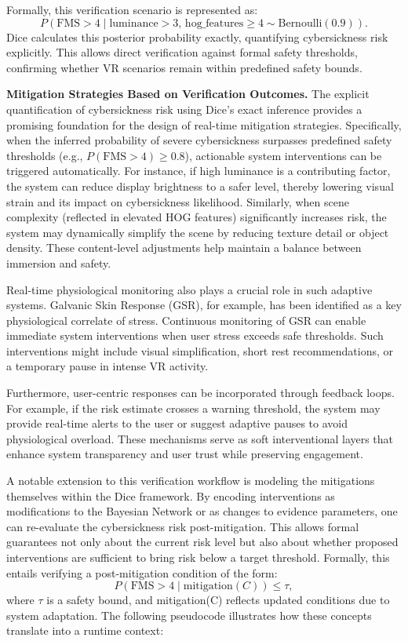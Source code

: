\documentclass{vgtc}                          %
\begin{document}
Formally, this verification scenario is represented as:
\begin{equation}
    P(\text{FMS} > 4 \mid \text{luminance}>3,\,\text{hog\_features}\geq 4\sim\text{Bernoulli}(0.9)).
\end{equation}
Dice calculates this posterior probability exactly, quantifying cybersickness risk explicitly. This allows direct verification against formal safety thresholds, confirming whether VR scenarios remain within predefined safety bounds.


\vspace{2pt}
\noindent\textbf{Mitigation Strategies Based on Verification Outcomes.} The explicit quantification of cybersickness risk using Dice's exact inference provides a promising foundation for the design of real-time mitigation strategies. Specifically, when the inferred probability of severe cybersickness surpasses predefined safety thresholds (e.g., \(P(\text{FMS} > 4) \geq 0.8\)), actionable system interventions can be triggered automatically. 
For instance, if high luminance is a contributing factor, the system can reduce display brightness to a safer level, thereby lowering visual strain and its impact on cybersickness likelihood. Similarly, when scene complexity (reflected in elevated HOG features) significantly increases risk, the system may dynamically simplify the scene by reducing texture detail or object density. These content-level adjustments help maintain a balance between immersion and safety.

Real-time physiological monitoring also plays a crucial role in such adaptive systems. Galvanic Skin Response (GSR), for example, has been identified as a key physiological correlate of stress. Continuous monitoring of GSR can enable immediate system interventions when user stress exceeds safe thresholds. Such interventions might include visual simplification, short rest recommendations, or a temporary pause in intense VR activity.

Furthermore, user-centric responses can be incorporated through feedback loops. For example, if the risk estimate crosses a warning threshold, the system may provide real-time alerts to the user or suggest adaptive pauses to avoid physiological overload. These mechanisms serve as soft interventional layers that enhance system transparency and user trust while preserving engagement.

A notable extension to this verification workflow is modeling the mitigations themselves within the Dice framework. By encoding interventions as modifications to the Bayesian Network or as changes to evidence parameters, one can re-evaluate the cybersickness risk post-mitigation. This allows formal guarantees not only about the current risk level but also about whether proposed interventions are sufficient to bring risk below a target threshold. Formally, this entails verifying a post-mitigation condition of the form:
\[
P(\text{FMS} > 4 \mid \text{mitigation}(C))\leq \tau,
\]
where $\tau$ is a safety bound, and mitigation(C) reflects updated conditions due to system adaptation. The following pseudocode illustrates how these concepts translate into a runtime context:
\end{document}
